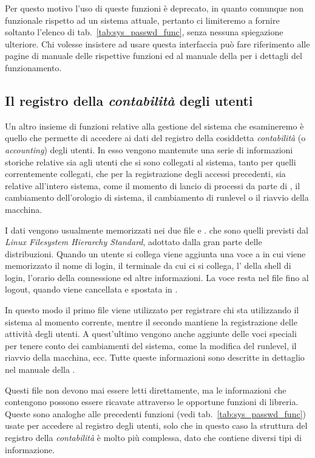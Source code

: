 Per questo motivo l'uso di queste funzioni è deprecato, in quanto comunque non
funzionale rispetto ad un sistema attuale, pertanto ci limiteremo a fornire
soltanto l'elenco di tab.~\ref{tab:sys_passwd_func}, senza nessuna spiegazione
ulteriore.  Chi volesse insistere ad usare questa interfaccia può fare
riferimento alle pagine di manuale delle rispettive funzioni ed al manuale
della  per i dettagli del funzionamento.



\subsection{Il registro della \textsl{contabilità} degli utenti}
\label{sec:sys_accounting}

Un altro insieme di funzioni relative alla gestione del sistema che
esamineremo è quello che permette di accedere ai dati del registro della
cosiddetta \textsl{contabilità} (o \textit{accounting}) degli utenti.  In esso
vengono mantenute una serie di informazioni storiche relative sia agli utenti
che si sono collegati al sistema, tanto per quelli correntemente collegati,
che per la registrazione degli accessi precedenti, sia relative all'intero
sistema, come il momento di lancio di processi da parte di , il
cambiamento dell'orologio di sistema, il cambiamento di runlevel o il riavvio
della macchina.

I dati vengono usualmente memorizzati nei due file  e
. che sono quelli previsti dal \textit{Linux Filesystem
  Hierarchy Standard}, adottato dalla gran parte delle distribuzioni.  Quando
un utente si collega viene aggiunta una voce a  in cui
viene memorizzato il nome di login, il terminale da cui ci si collega,
l' della shell di login, l'orario della connessione ed altre
informazioni.  La voce resta nel file fino al logout, quando viene cancellata
e spostata in .

In questo modo il primo file viene utilizzato per registrare chi sta
utilizzando il sistema al momento corrente, mentre il secondo mantiene la
registrazione delle attività degli utenti. A quest'ultimo vengono anche
aggiunte delle voci speciali per tenere conto dei cambiamenti del sistema,
come la modifica del runlevel, il riavvio della macchina, ecc. Tutte queste
informazioni sono descritte in dettaglio nel manuale della .

Questi file non devono mai essere letti direttamente, ma le informazioni che
contengono possono essere ricavate attraverso le opportune funzioni di
libreria. Queste sono analoghe alle precedenti funzioni (vedi
tab.~\ref{tab:sys_passwd_func}) usate per accedere al registro degli utenti,
solo che in questo caso la struttura del registro della \textsl{contabilità} è
molto più complessa, dato che contiene diversi tipi di informazione.

